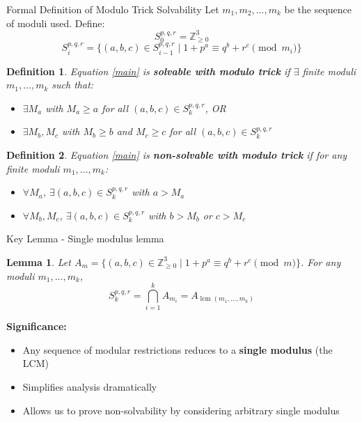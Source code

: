 ﻿\documentclass[10pt,aspectratio=169]{beamer}
\newtheorem{lemmas}{Lemma}
\newtheorem{Definitionn}{Definition}
\begin{document}
\begin{frame}{Formal Definition of Modulo Trick Solvability}
    Let $m_1,m_2,...,m_k$ be the sequence of moduli used. Define:
    \[S_0^{p,q,r} = \mathbb{Z}_{\geq 0}^3\]
    \[S_i^{p,q,r} = \{(a,b,c)\in S_{i-1}^{p,q,r} \; | \; 1+p^a \equiv q^b+r^c \pmod{m_i}\}\]
    
    \begin{Definitionn}
        Equation \eqref{main} is \textbf{solvable with modulo trick} if $\exists$ finite moduli $m_1,...,m_k$ such that:
        \begin{itemize}
            \item $\exists M_a$ with $M_a \geq a$ for all $(a,b,c) \in S_k^{p,q,r}$, OR
            \item $\exists M_b,M_c$ with $M_b \geq b$ and $M_c \geq c$ for all $(a,b,c) \in S_k^{p,q,r}$
        \end{itemize}
    \end{Definitionn}
    
    \begin{Definitionn}
        Equation \eqref{main} is \textbf{non-solvable with modulo trick} if for any finite moduli $m_1,...,m_k$:
        \begin{itemize}
            \item $\forall M_a$, $\exists (a,b,c) \in S_k^{p,q,r}$ with $a > M_a$
            \item $\forall M_b,M_c$, $\exists (a,b,c) \in S_k^{p,q,r}$ with $b > M_b$ or $c > M_c$
        \end{itemize}
    \end{Definitionn}
\end{frame}
\begin{frame}{Key Lemma - Single modulus lemma}
    \begin{lemmas}
        Let $A_m = \{(a,b,c) \in \mathbb{Z}_{\geq 0}^3 \; | \; 1+p^a \equiv q^b+r^c \pmod{m}\}$.
        For any moduli $m_1,...,m_k$,
        \[S_k^{p,q,r} = \bigcap_{i=1}^k A_{m_i} = A_{\operatorname{lcm}(m_1,...,m_k)}\]
    \end{lemmas}
    
    \textbf{Significance:}
    \begin{itemize}
        \item Any sequence of modular restrictions reduces to a \textbf{single modulus} (the LCM)
        \item Simplifies analysis dramatically
        \item Allows us to prove non-solvability by considering arbitrary single modulus
    \end{itemize}
\end{frame}
\end{document}
